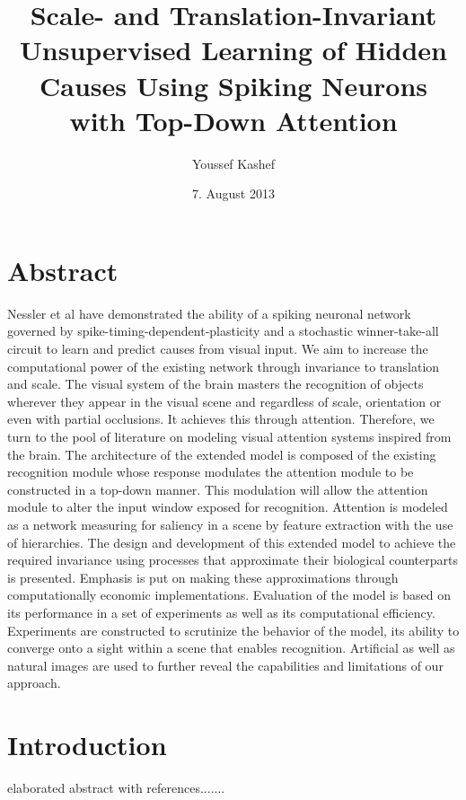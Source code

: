 \documentclass{report}%
\begin{document}
\title{Scale- and Translation-Invariant Unsupervised Learning of Hidden Causes Using Spiking Neurons with Top-Down Attention}
\author{Youssef Kashef}
\date{7. August 2013}
\maketitle
\tableofcontents

\chapter{Abstract}

Nessler et al have demonstrated the ability of a spiking neuronal network governed by spike-timing-dependent-plasticity and a stochastic winner-take-all circuit to learn and predict causes from visual input. We aim to increase the computational power of the existing network through invariance to translation and scale. The visual system of the brain masters the recognition of objects wherever they appear in the visual scene and regardless of scale, orientation or even with partial occlusions. It achieves this through attention. Therefore, we turn to the pool of literature on modeling visual attention systems inspired from the brain. The architecture of the extended model is composed of the existing recognition module whose response modulates the attention module to be constructed in a top-down manner. This modulation will allow the attention module to alter the input window exposed for recognition. Attention is modeled as a network measuring for saliency in a scene by feature extraction with the use of hierarchies. The design and development of this extended model to achieve the required invariance using processes that approximate their biological counterparts is presented. Emphasis is put on making these approximations through computationally economic implementations. Evaluation of the model is based on its performance in a set of experiments as well as its computational efficiency. Experiments are constructed to scrutinize the behavior of the model, its ability to converge onto a sight within a scene that enables recognition. Artificial as well as natural images are used to further reveal the capabilities and limitations of our approach.

\chapter{Introduction}

elaborated abstract with references.......\cite{Nessler2010}
\end{document}
